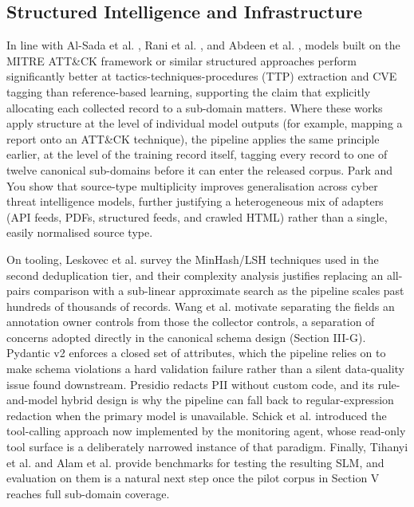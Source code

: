 \documentclass[conference]{IEEEtran}
\begin{document}
\subsection{Structured Intelligence and Infrastructure}

In line with Al-Sada et al. \cite{alsada2025attck}, Rani et al. \cite{rani2024ttpxhunter}, and Abdeen et al. \cite{abdeen2023smet}, models built on the MITRE ATT\&CK framework or similar structured approaches perform significantly better at tactics-techniques-procedures (TTP) extraction and CVE tagging than reference-based learning, supporting the claim that explicitly allocating each collected record to a sub-domain matters. Where these works apply structure at the level of individual model outputs (for example, mapping a report onto an ATT\&CK technique), the pipeline applies the same principle earlier, at the level of the training record itself, tagging every record to one of twelve canonical sub-domains before it can enter the released corpus. Park and You \cite{park2023pretrained} show that source-type multiplicity improves generalisation across cyber threat intelligence models, further justifying a heterogeneous mix of adapters (API feeds, PDFs, structured feeds, and crawled HTML) rather than a single, easily normalised source type.

On tooling, Leskovec et al. \cite{leskovec2014mmd} survey the MinHash/LSH techniques used in the second deduplication tier, and their complexity analysis justifies replacing an all-pairs comparison with a sub-linear approximate search as the pipeline scales past hundreds of thousands of records. Wang et al. \cite{wang2023selfinstruct} motivate separating the fields an annotation owner controls from those the collector controls, a separation of concerns adopted directly in the canonical schema design (Section III-G). Pydantic v2 \cite{pydanticv2} enforces a closed set of attributes, which the pipeline relies on to make schema violations a hard validation failure rather than a silent data-quality issue found downstream. Presidio \cite{presidio2023} redacts PII without custom code, and its rule-and-model hybrid design is why the pipeline can fall back to regular-expression redaction when the primary model is unavailable. Schick et al. \cite{schick2023toolformer} introduced the tool-calling approach now implemented by the monitoring agent, whose read-only tool surface is a deliberately narrowed instance of that paradigm. Finally, Tihanyi et al. \cite{tihanyi2024cybermetric} and Alam et al. \cite{alam2024ctibench} provide benchmarks for testing the resulting SLM, and evaluation on them is a natural next step once the pilot corpus in Section V reaches full sub-domain coverage.
\end{document}
